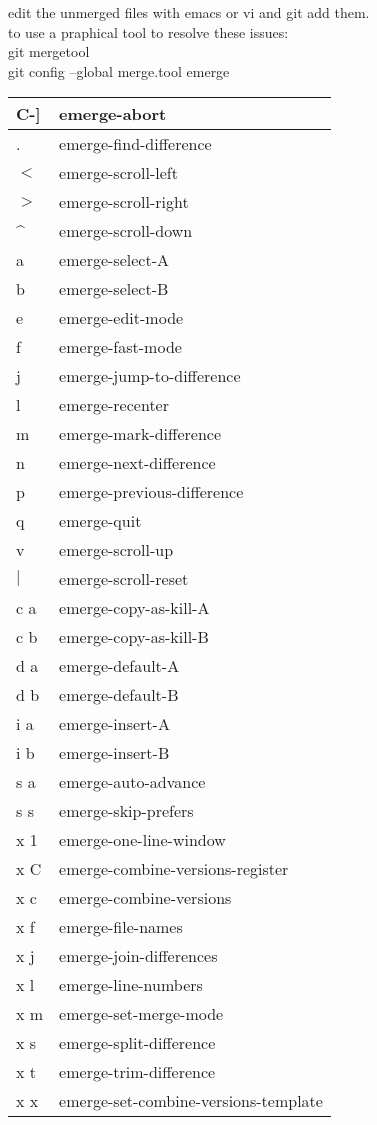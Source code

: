 \documentclass[11pt]{article}
\begin{document}
edit the unmerged files with emacs or vi and git add them.\\

to use a praphical tool to resolve these issues:\\
git mergetool\\

git config --global merge.tool emerge\\

\begin{center}
\begin{tabular}{|l|l|}
\hline
C-] & emerge-abort \\
\hline
. & emerge-find-difference \\
\hline
$<$ & emerge-scroll-left \\
\hline
$>$ & emerge-scroll-right \\
\hline
\^ & emerge-scroll-down \\
\hline
a & emerge-select-A \\
\hline
b & emerge-select-B \\
\hline
e & emerge-edit-mode \\
\hline
f & emerge-fast-mode \\
\hline
j & emerge-jump-to-difference \\
\hline
l & emerge-recenter \\
\hline
m & emerge-mark-difference \\
\hline
n & emerge-next-difference \\
\hline
p & emerge-previous-difference \\
\hline
q & emerge-quit \\
\hline
v & emerge-scroll-up \\
\hline
$|$ & emerge-scroll-reset \\
\hline
c a & emerge-copy-as-kill-A \\
\hline
c b & emerge-copy-as-kill-B \\
\hline
d a & emerge-default-A \\
\hline
d b & emerge-default-B \\
\hline
i a & emerge-insert-A \\
\hline
i b & emerge-insert-B \\
\hline
s a & emerge-auto-advance \\
\hline
s s & emerge-skip-prefers \\
\hline
x 1 & emerge-one-line-window \\
\hline
x C & emerge-combine-versions-register \\
\hline
x c & emerge-combine-versions \\
\hline
x f & emerge-file-names \\
\hline
x j & emerge-join-differences \\
\hline
x l & emerge-line-numbers \\
\hline
x m & emerge-set-merge-mode \\
\hline
x s & emerge-split-difference \\
\hline
x t & emerge-trim-difference \\
\hline
x x & emerge-set-combine-versions-template \\
\hline
\end{tabular}
\end{center}
\end{document}
